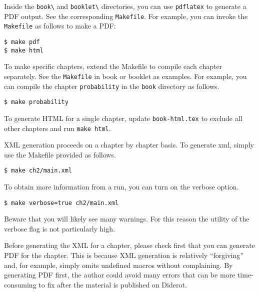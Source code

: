\begin{gram}
Inside the \lstinline`book\` and \lstinline`booklet\` directories, 
you can use \lstinline`pdflatex` to generate a PDF output.  See the corresponding \lstinline`Makefile`.
%
For example, you can  invoke the \lstinline`Makefile` as follows to make a PDF:
\begin{lstlisting}
$ make pdf
$ make html
\end{lstlisting}
\end{gram}


\begin{gram}
To make specific chapters,  extend the Makefile to compile each chapter separately.  See the \lstinline`Makefile` in book or booklet as examples.
%
For example, you can compile the chapter \lstinline`probability` in the \lstinline`book` directory as follows.
\begin{lstlisting}
$ make probability
\end{lstlisting}

To generate HTML for a single chapter, update \lstinline`book-html.tex` to exclude all other chapters and run \lstinline`make html`.

\end{gram}


\begin{gram}
XML generation proceeds on a chapter by chapter basis.
%
To generate xml, simply use the Makefile provided as follows.
%
\begin{lstlisting}
$ make ch2/main.xml
\end{lstlisting}
%

To obtain more information from a run, you can turn on the verbose option.
%
\begin{lstlisting}
$ make verbose=true ch2/main.xml
\end{lstlisting}

Beware that you will likely see many warnings.  For this reason the utility of the verbose flag is not particularly high.
\end{gram}

\begin{important}
Before generating the XML for a chapter, please check first that you can generate PDF for the chapter.  This is because XML generation is relatively ``forgiving'' and, for example, simply omits undefined macros without complaining.  By generating PDF first, the author could avoid many errors that can be more time-consuming to fix after the material is published on Diderot.
\end{important}


